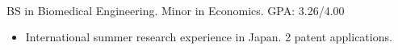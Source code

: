 \documentclass[margin]{res}
\begin{document}
\begin{sloppypar}
\begin{resume}




\\
BS in Biomedical Engineering. Minor in Economics. GPA: 3.26/4.00
\begin{itemize}
    \item International summer research experience in Japan. 2 patent applications.
\end{itemize}


\end{resume}
\end{sloppypar}
\end{document}
